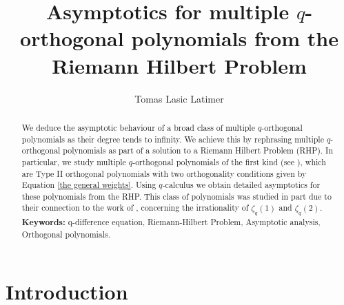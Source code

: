\documentclass[a4paper,reqno]{amsart}
\title{Asymptotics for multiple $q$-orthogonal polynomials from the Riemann Hilbert Problem}
\author{Tomas Lasic Latimer}
\date{}
\numberwithin{equation}{section}
\numberwithin{figure}{section}
\begin{document}
\begin{abstract}
    We deduce the asymptotic behaviour of a broad class of multiple $q$-orthogonal polynomials as their degree tends to infinity.  We achieve this by rephrasing multiple $q$-orthogonal polynomials as part of a solution to a Riemann Hilbert Problem (RHP). In particular, we study multiple $q$-orthogonal polynomials of the first kind (see \cite{postelmans2005multiple}), which are Type II orthogonal polynomials with two orthogonality conditions given by Equation \eqref{the general weights}. Using $q$-calculus we obtain detailed asymptotics for these polynomials from the RHP. This class of polynomials was studied in part due to their connection to the work of \cites{POSTELMANS2007119}{postelmans2005multiple}, concerning the irrationality of $\zeta_q(1)$ and $\zeta_q(2)$. \\
    
    \noindent \textbf{Keywords:} q-difference equation, Riemann-Hilbert Problem, Asymptotic analysis, Orthogonal polynomials.
\end{abstract}

\maketitle

\tableofcontents


\section{Introduction}
\end{document}
